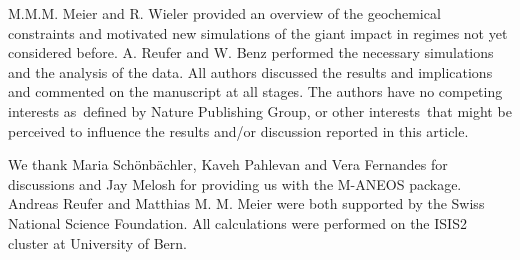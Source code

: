 M.M.M. Meier and R. Wieler provided an overview of the geochemical constraints and motivated new simulations of the giant impact in regimes not yet considered before. A. Reufer and W. Benz performed the necessary simulations and the analysis of the data. All authors discussed the results and implications and commented on the manuscript at all stages. The authors have no competing interests as defined by Nature Publishing Group, or other interests that might be perceived to influence the results and/or discussion reported in this article.

We thank Maria Schönbächler, Kaveh Pahlevan and Vera Fernandes for discussions and Jay Melosh for providing us with the M-ANEOS package. Andreas Reufer and Matthias M. M. Meier were both supported by the Swiss National Science Foundation. All calculations were performed on the ISIS2 cluster at University of Bern.
